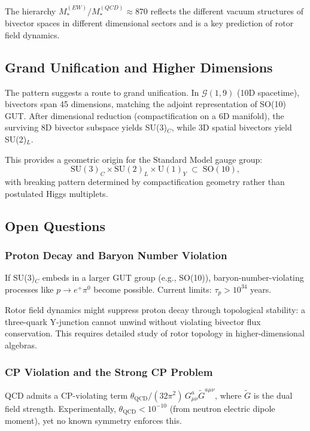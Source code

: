 \documentclass[11pt,a4paper]{article}
\newcommand{\Cl}{\mathcal{G}}
\newcommand{\SU}{\mathrm{SU}}
\newcommand{\U}{\mathrm{U}}
\newcommand{\SO}{\mathrm{SO}}
\theoremstyle{definition}
\theoremstyle{plain}
\theoremstyle{remark}
\begin{document}
The hierarchy $M_*^{(EW)} / M_*^{(QCD)} \approx 870$ reflects the different vacuum structures of bivector spaces in different dimensional sectors and is a key prediction of rotor field dynamics.

\subsection{Grand Unification and Higher Dimensions}

The pattern suggests a route to grand unification. In $\Cl(1,9)$ (10D spacetime), bivectors span 45 dimensions, matching the adjoint representation of SO(10) GUT. After dimensional reduction (compactification on a 6D manifold), the surviving 8D bivector subspace yields SU(3)$_C$, while 3D spatial bivectors yield SU(2)$_L$.

This provides a geometric origin for the Standard Model gauge group:
\begin{equation}
\SU(3)_C \times \SU(2)_L \times \U(1)_Y \;\subset\; \SO(10),
\end{equation}
with breaking pattern determined by compactification geometry rather than postulated Higgs multiplets.

\subsection{Open Questions}

\subsubsection{Proton Decay and Baryon Number Violation}

If SU(3)$_C$ embeds in a larger GUT group (e.g., SO(10)), baryon-number-violating processes like $p \to e^+ \pi^0$ become possible. Current limits: $\tau_p > 10^{34}$ years.

Rotor field dynamics might suppress proton decay through topological stability: a three-quark Y-junction cannot unwind without violating bivector flux conservation. This requires detailed study of rotor topology in higher-dimensional algebras.

\subsubsection{CP Violation and the Strong CP Problem}

QCD admits a CP-violating term $\theta_{\mathrm{QCD}}/(32\pi^2)\,G_{\mu\nu}^a \tilde{G}^{a\mu\nu}$, where $\tilde{G}$ is the dual field strength. Experimentally, $\theta_{\mathrm{QCD}} < 10^{-10}$ (from neutron electric dipole moment), yet no known symmetry enforces this.
\end{document}
